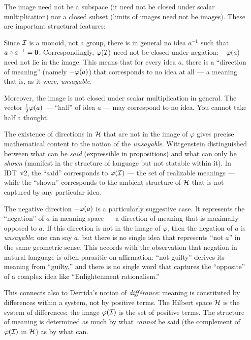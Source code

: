 The image need not be a subspace (it need not be closed under scalar
multiplication) nor a closed subset (limits of images need not be images). These
are important structural features:

\begin{remark}
\label{rmk:image-not-subspace}
Since $\mathcal{I}$ is a monoid, not a group, there is in general no idea $a^{-1}$ such
that $a \circ a^{-1} = \mathbf{0}$. Correspondingly, $\varphi(\mathcal{I})$ need not be
closed under negation: $-\varphi(a)$ need not lie in the image. This means that
for every idea $a$, there is a ``direction of meaning'' (namely $-\varphi(a)$)
that corresponds to no idea at all --- a meaning that is, as it were,
\emph{unsayable}.

Moreover, the image is not closed under scalar multiplication in general. The
vector $\frac{1}{2}\varphi(a)$ --- ``half'' of idea $a$ --- may correspond to no
idea. You cannot take half a thought.
\end{remark}

\begin{interpretation}
\label{interp:unsayable}
The existence of directions in $\mathcal{H}$ that are not in the image of $\varphi$
gives precise mathematical content to the notion of the \emph{unsayable}.
Wittgenstein distinguished between what can be \emph{said} (expressible in
propositions) and what can only be \emph{shown} (manifest in the structure of
language but not statable within it). In IDT~v2, the ``said'' corresponds to
$\varphi(\mathcal{I})$ --- the set of realizable meanings --- while the ``shown''
corresponds to the ambient structure of $\mathcal{H}$ that is not captured by any
particular idea.

The negative direction $-\varphi(a)$ is a particularly suggestive case. It
represents the ``negation'' of $a$ in meaning space --- a direction of meaning
that is maximally opposed to $a$. If this direction is not in the image of
$\varphi$, then the negation of $a$ is \emph{unsayable}: one can say $a$, but
there is no single idea that represents ``not $a$'' in the same geometric
sense. This accords with the observation that negation in natural language is
often parasitic on affirmation: ``not guilty'' derives its meaning from
``guilty,'' and there is no single word that captures the ``opposite'' of
a complex idea like ``Enlightenment rationalism.''

This connects also to Derrida's notion of \emph{diff\'erance}: meaning is
constituted by differences within a system, not by positive terms. The Hilbert
space $\mathcal{H}$ is the system of differences; the image $\varphi(\mathcal{I})$ is the
set of positive terms. The structure of meaning is determined as much by what
\emph{cannot} be said (the complement of $\varphi(\mathcal{I})$ in $\mathcal{H}$) as by
what can.
\end{interpretation}


